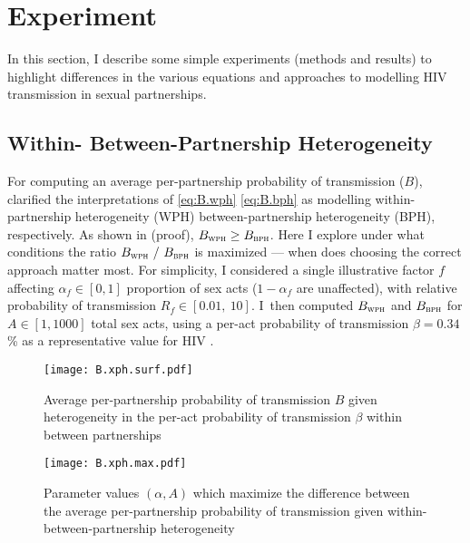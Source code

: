 \section{Experiment}\label{foi.exp}
In this section, I describe some simple experiments (methods and results) to
highlight differences in the various equations and approaches
to modelling HIV transmission in sexual partnerships.
\subsection{Within- \vs Between-Partnership Heterogeneity}\label{foi.exp.xph}
For computing an average per-partnership probability of transmission ($B$),
 clarified the interpretations of
\eqref{eq:B.wph} \vs \eqref{eq:B.bph} as modelling
within-partnership heterogeneity (WPH) \vs between-partnership heterogeneity (BPH), respectively.
As shown in  (proof), $B_{\textsc{wph}} \ge B_{\textsc{bph}}$.
Here I explore under what conditions the ratio $B_{\textsc{wph}}~/~B_{\textsc{bph}}$ is maximized
--- \ie when does choosing the correct approach matter most.
For simplicity, I considered a single illustrative factor $f$
affecting $\alpha_f \in [0,1]$ proportion of sex acts ($1-\alpha_f$ are unaffected),
with relative probability of transmission $R_f \in [0.01,~10]$.
I~then computed $B_{\textsc{wph}}$ and $B_{\textsc{bph}}$ for $A \in [1,1000]$ total sex acts,
using a per-act probability of transmission $\beta = 0.34$\%
as a representative value for HIV \cite{Boily2009}.
\par
\begin{figure}
  \centering\texttt{[image: B.xph.surf.pdf]}
  \caption{Average per-partnership probability of transmission $B$
    given heterogeneity in the per-act probability of transmission $\beta$
    within \vs between partnerships}
  \label{fig:B.xph.surf}
\end{figure}
\begin{figure}
  \centering\texttt{[image: B.xph.max.pdf]}
  \caption{Parameter values $(\alpha,A)$ which maximize the difference between
    the average per-partnership probability of transmission
    given within- \vs between-partnership heterogeneity}
  \label{fig:B.xph.max}
\end{figure}
